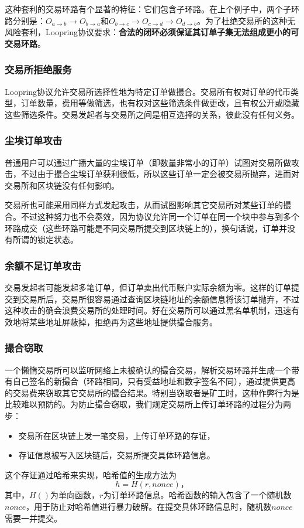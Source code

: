 \documentclass[UTF8,nofonts]{ctexart}
\begin{document}
这种套利的交易环路有个显著的特征：它们包含子环路。在上个例子中，两个子环路分别是：$O_{a\rightarrow b}\rightarrow O_{b\rightarrow a}$和$O_{b\rightarrow c}\rightarrow O_{c\rightarrow d}\rightarrow O_{d\rightarrow b}$。为了杜绝交易所的这种无风险套利，Loopring协议要求：{\bfseries 合法的闭环必须保证其订单子集无法组成更小的可交易环路}。

\subsubsection{交易所拒绝服务}

Loopring协议允许交易所选择性地为特定订单做撮合。交易所有权对订单的代币类型，订单数量，费用等做筛选，也有权对这些筛选条件做更改，且有权公开或隐藏这些筛选条件。交易发起者与交易所之间是相互选择的关系，彼此没有任何义务。

\subsubsection{尘埃订单攻击}
普通用户可以通过广播大量的尘埃订单（即数量非常小的订单）试图对交易所做攻击，不过由于撮合尘埃订单获利很低，所以这些订单一定会被交易所抛弃，进而对交易所和区块链没有任何影响。

交易所也可能采用同样方式发起攻击，从而试图影响其它交易所对某些订单的撮合。不过这种努力也不会奏效，因为协议允许同一个订单在同一个块中参与到多个环路成交（这些环路可能是不同交易所提交到区块链上的），换句话说，订单并没有所谓的锁定状态。

\subsubsection{余额不足订单攻击}

交易发起者可能发起多笔订单，但订单卖出代币账户实际余额为零。这样的订单提交到交易所后，交易所很容易通过查询区块链地址的余额信息将该订单抛弃，不过这种攻击的确会浪费交易所的处理时间。好在交易所可以通过黑名单机制，迅速有效地将某些地址屏蔽掉，拒绝再为这些地址提供撮合服务。

\subsubsection{撮合窃取}

一个懒惰交易所可以监听网络上未被确认的撮合交易，解析交易环路并生成一个带有自己签名的新撮合（环路相同，只有受益地址和数字签名不同），通过提供更高的交易费来窃取其它交易所的撮合结果。特别当窃取者是矿工时，这种作弊行为是比较难以预防的。为防止撮合窃取，我们规定交易所上传订单环路的过程分为两步：
\begin{itemize}
    \item 交易所在区块链上发一笔交易，上传订单环路的存证，
    \item 存证信息被写入区块链后，交易所提交具体环路信息。
\end{itemize}
这个存证通过哈希来实现，哈希值的生成方法为
$$h = H(r, nonce)\text{，}$$
其中，$H()$为单向函数，$r$为订单环路信息。哈希函数的输入包含了一个随机数$nonce$，用于防止对哈希值进行暴力破解。在提交具体环路信息时，随机数$nonce$需要一并提交。
\end{document}
